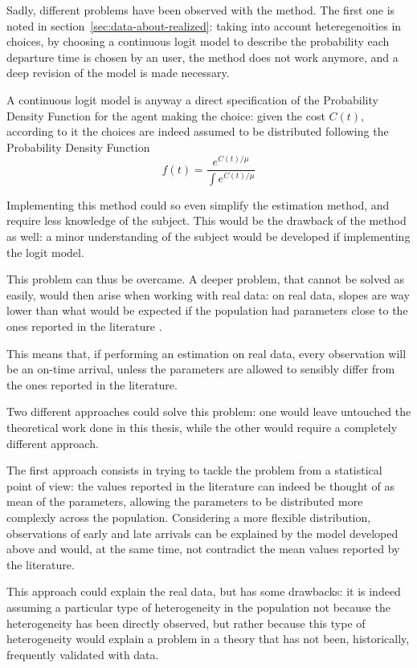 Sadly, different problems have been observed with the method.
The first one is noted in section~\ref{sec:data-about-realized}:
taking into account heteregenoities in choices,
by choosing a continuous logit model to describe the probability each departure time is chosen by an user,
the method does not work anymore,
and a deep revision of the model is made necessary.

A continuous logit model is anyway a direct specification of the Probability Density Function for the agent making the choice:
given the cost \(C(t)\),
according to it the choices are indeed assumed to be distributed following the Probability Density Function
\begin{equation*}
  f(t) = \frac{e^{C(t)/\mu}}{\int e^{C(t)/\mu}}
\end{equation*}

Implementing this method could so even simplify the estimation method,
and require less knowledge of the subject.
This would be the drawback of the method as well:
a minor understanding of the subject would be developed if implementing the logit model.

This problem can thus be overcame.
A deeper problem, that cannot be solved as easily,
would then arise when working with real data:
on real data, slopes are way lower than what would be expected if the population had parameters close to the ones reported in the literature \parencite{https://doi.org/10.1111/iere.12692}.

This means that, if performing an estimation on real data,
every observation will be an on-time arrival,
unless the parameters are allowed to sensibly differ from the ones reported in the literature.

Two different approaches could solve this problem:
one would leave untouched the theoretical work done in this thesis,
while the other would require a completely different approach.

The first approach consists in trying to tackle the problem from a statistical point of view:
the values reported in the literature can indeed be thought of as mean of the parameters,
allowing the parameters to be distributed more complexly across the population.
Considering a more flexible distribution,
observations of early and late arrivals can be explained by the model developed above and would,
at the same time,
not contradict the mean values reported by the literature.

This approach could explain the real data, but has some drawbacks:
it is indeed assuming a particular type of heterogeneity in the population not because the heterogeneity has been directly observed,
but rather because this type of heterogeneity would explain a problem in a theory that has not been,
historically,
frequently validated with data.

